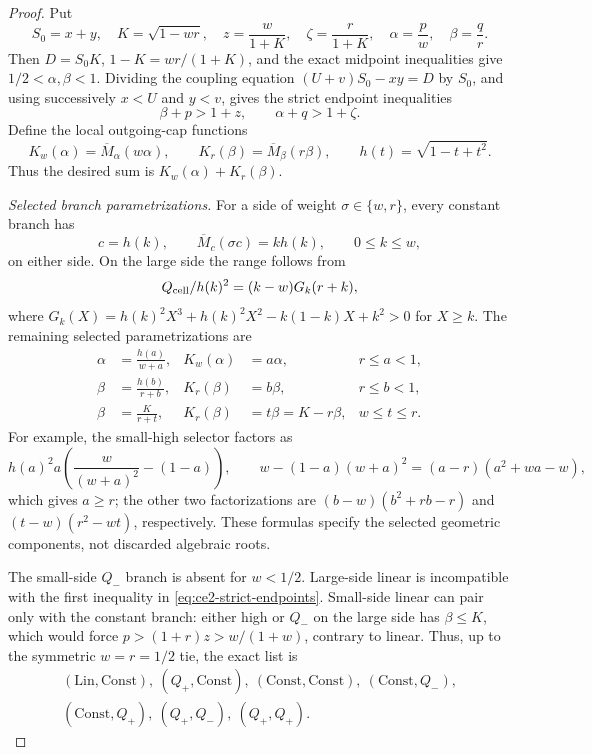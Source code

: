 \begin{proof}
Put
\[
 S_0=x+y,\quad K=\sqrt{1-wr},\quad
 z=\frac{w}{1+K},\quad\zeta=\frac{r}{1+K},
 \quad\alpha=\frac pw,\quad\beta=\frac qr.
\]
Then $D=S_0K$, $1-K=wr/(1+K)$, and the exact midpoint inequalities give
$1/2<\alpha,\beta<1$.  Dividing the coupling equation
$(U+v)S_0-xy=D$ by $S_0$, and using successively $x<U$ and $y<v$, gives
the strict endpoint inequalities
\begin{equation}
 \beta+p>1+z,\qquad \alpha+q>1+\zeta.
 \label{eq:ce2-strict-endpoints}
\end{equation}
Define the local outgoing-cap functions
\[
 K_w(\alpha)=\overline M_\alpha(w\alpha),\qquad
 K_r(\beta)=\overline M_\beta(r\beta),\qquad
 h(t)=\sqrt{1-t+t^2}.
\]
Thus the desired sum is $K_w(\alpha)+K_r(\beta)$.

\smallskip\noindent
\emph{Selected branch parametrizations.}
For a side of weight $\sigma\in\{w,r\}$, every constant branch has
\begin{equation}
 c=h(k),\qquad \overline M_c(\sigma c)=kh(k),\qquad0\le k\le w,
 \label{eq:two-endpoint-L-param}
\end{equation}
on either side.  On the large side the range follows from
\[
 Q_{\rm cell}/h(k)^2=(k-w)G_k(r+k),
\]
where
$G_k(X)=h(k)^2X^3+h(k)^2X^2-k(1-k)X+k^2>0$ for $X\ge k$.
The remaining selected parametrizations are
\begin{align}
 \alpha&=\frac{h(a)}{w+a},&
 K_w(\alpha)&=a\alpha,& r\le a<1,
 \label{eq:two-endpoint-small-high}\\
 \beta&=\frac{h(b)}{r+b},&
 K_r(\beta)&=b\beta,& r\le b<1,
 \label{eq:two-endpoint-large-high}\\
 \beta&=\frac K{r+t},&
 K_r(\beta)&=t\beta=K-r\beta,& w\le t\le r.
 \label{eq:two-endpoint-large-tminus}
\end{align}
For example, the small-high selector factors as
\[
 h(a)^2a\left(\frac{w}{(w+a)^2}-(1-a)\right),\qquad
 w-(1-a)(w+a)^2=(a-r)(a^2+wa-w),
\]
which gives $a\ge r$; the other two factorizations are
$(b-w)(b^2+rb-r)$ and $(t-w)(r^2-wt)$, respectively.  These formulas
specify the selected geometric components, not discarded algebraic roots.

The small-side $Q_-$ branch is absent for $w<1/2$.  Large-side linear is
incompatible with the first inequality in
\eqref{eq:ce2-strict-endpoints}.  Small-side linear can pair only with the constant branch:
either high or $Q_-$ on the large side has $\beta\le K$, which would force
$p>(1+r)z>w/(1+w)$, contrary to linear.  Thus, up to the symmetric
$w=r=1/2$ tie, the exact list is
\begin{equation}
 \begin{gathered}
 (\mathrm{Lin},\mathrm{Const}),\ (Q_+,\mathrm{Const}),\
 (\mathrm{Const},\mathrm{Const}),\ (\mathrm{Const},Q_-),\\
 (\mathrm{Const},Q_+),\ (Q_+,Q_-),\ (Q_+,Q_+).
 \end{gathered}
 \label{eq:two-endpoint-pairs}
\end{equation}


\end{proof}
